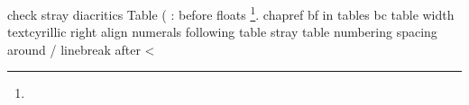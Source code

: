 check stray diacritics
Table (
: before floats
\footnote{}.
chapref
bf in tables
bc table width
textcyrillic
right align numerals
following table
stray table numbering
spacing around /
linebreak after <